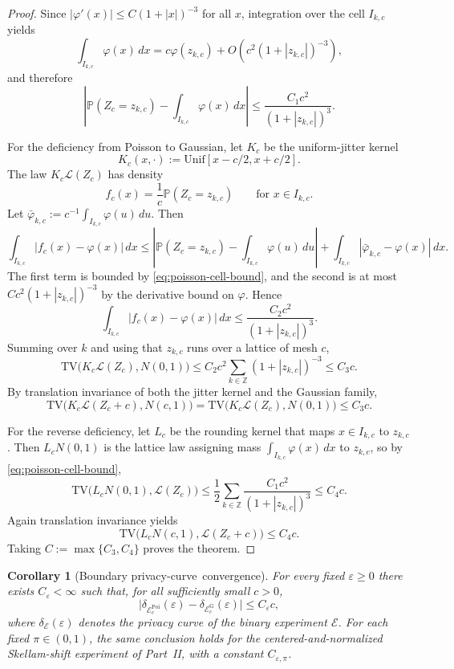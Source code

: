 \documentclass{article}
\newtheorem{corollary}[theorem]{Corollary}
\newcommand{\TV}{\mathrm{TV}}
\newcommand{\Pbb}{\mathbb P}
\newcommand{\1}{\mathbf 1}
\newcommand{\privacycurve}{\mbox{privacy-curve}}
\begin{document}
\begin{proof}
Since $|\varphi'(x)|\le C(1+|x|)^{-3}$ for all $x$, integration over the cell $I_{k,c}$ yields
\[
\int_{I_{k,c}}\varphi(x)\,dx
=
c\varphi(z_{k,c})+O\!\left(c^2(1+|z_{k,c}|)^{-3}\right),
\]
and therefore
\begin{equation}
\left|\Pbb(Z_c=z_{k,c})-\int_{I_{k,c}}\varphi(x)\,dx\right|
\le \frac{C_1c^2}{(1+|z_{k,c}|)^3}.
\label{eq:poisson-cell-bound}
\end{equation}

For the deficiency from Poisson to Gaussian, let $K_c$ be the uniform-jitter kernel
\[
K_c(x,\cdot):=\mathrm{Unif}[x-c/2,x+c/2].
\]
The law $K_c\mathcal L(Z_c)$ has density
\[
f_c(x)=\frac{1}{c}\Pbb(Z_c=z_{k,c})\qquad \text{for }x\in I_{k,c}.
\]
Let $\bar\varphi_{k,c}:=c^{-1}\int_{I_{k,c}}\varphi(u)\,du$. Then
\[
\int_{I_{k,c}}|f_c(x)-\varphi(x)|\,dx
\le \left|\Pbb(Z_c=z_{k,c})-\int_{I_{k,c}}\varphi(u)\,du\right|
+\int_{I_{k,c}}|\bar\varphi_{k,c}-\varphi(x)|\,dx.
\]
The first term is bounded by \eqref{eq:poisson-cell-bound}, and the second is at most
$Cc^2(1+|z_{k,c}|)^{-3}$ by the derivative bound on $\varphi$. Hence
\[
\int_{I_{k,c}}|f_c(x)-\varphi(x)|\,dx\le \frac{C_2c^2}{(1+|z_{k,c}|)^3}.
\]
Summing over $k$ and using that $z_{k,c}$ runs over a lattice of mesh $c$,
\[
\TV\bigl(K_c\mathcal L(Z_c),N(0,1)\bigr)
\le C_2c^2\sum_{k\in\mathbb Z}(1+|z_{k,c}|)^{-3}
\le C_3c.
\]
By translation invariance of both the jitter kernel and the Gaussian family,
\[
\TV\bigl(K_c\mathcal L(Z_c+c),N(c,1)\bigr)
=\TV\bigl(K_c\mathcal L(Z_c),N(0,1)\bigr)
\le C_3c.
\]

For the reverse deficiency, let $L_c$ be the rounding kernel that maps $x\in I_{k,c}$ to $z_{k,c}$. Then
$L_cN(0,1)$ is the lattice law assigning mass $\int_{I_{k,c}}\varphi(x)\,dx$ to $z_{k,c}$, so by
\eqref{eq:poisson-cell-bound},
\[
\TV\bigl(L_cN(0,1),\mathcal L(Z_c)\bigr)
\le \frac12\sum_{k\in\mathbb Z}\frac{C_1c^2}{(1+|z_{k,c}|)^3}
\le C_4c.
\]
Again translation invariance yields
\[
\TV\bigl(L_cN(c,1),\mathcal L(Z_c+c)\bigr)\le C_4c.
\]
Taking $C:=\max\{C_3,C_4\}$ proves the theorem.
\end{proof}

\begin{corollary}[Boundary \privacycurve\ convergence]
\label{cor:boundary-BE-privacy}
For every fixed $\varepsilon\ge 0$ there exists $C_\varepsilon<\infty$ such that, for all sufficiently small
$c>0$,
\[
\bigl|\delta_{\mathcal E_c^{\mathrm{Poi}}}(\varepsilon)-\delta_{\mathcal E_c^{\mathrm G}}(\varepsilon)\bigr|
\le C_\varepsilon c,
\]
where $\delta_{\mathcal E}(\varepsilon)$ denotes the privacy curve of the binary experiment $\mathcal E$.
For each fixed $\pi\in(0,1)$, the same conclusion holds for the centered-and-normalized Skellam-shift
experiment of Part~II, with a constant $C_{\varepsilon,\pi}$.
\end{corollary}
\end{document}
